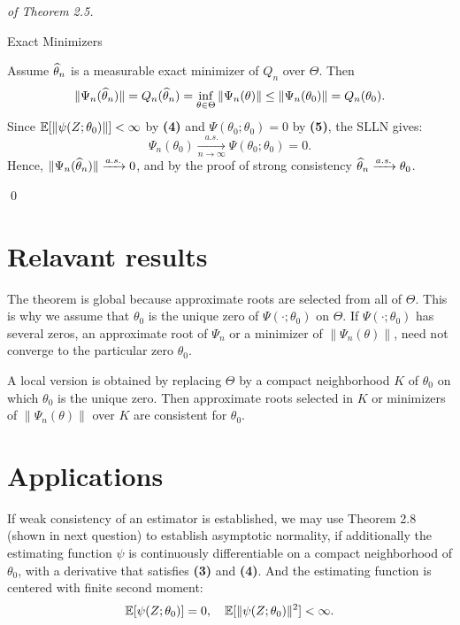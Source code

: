 \begin{proof}[of Theorem 2.5]
\begin{description}
\item[Exact Minimizers] 
\end{description}
Assume $\widehat{\theta}_n$ is a measurable exact minimizer of $Q_n$ over $\Theta$. Then
\[ 
  \| \Psi_n (\what{\theta}_n)\| = Q_n(\what{\theta}_n) = \inf_{\theta \in \Theta} \| \Psi_n(\theta)
  \| \le  \| \Psi_n(\theta_0) \| = Q_n (\theta_0)
.\]
Since $\mathbb{E}[ \| \psi(Z;\theta_0 ) \|] < \infty  $ by \textbf{(4)} and $\Psi(\theta_0;\theta_0)=0$ by
\textbf{(5)}, the SLLN gives:
\[ 
\Psi_n(\theta_0) \xrightarrow[n \to \infty ]{a.s.} \Psi(\theta_0;\theta_0) =0
.\]
Hence, $\| \Psi_n( \widehat{\theta}_n) \| \xrightarrow[]{a.s.} 0$, and by the proof of strong
consistency $\widehat{\theta}_n \xrightarrow[]{a.s.} \theta_0$.

\qed
\end{proof}


\section{Relavant results}

\begin{remark*}
  The theorem is global because approximate roots are selected from all of $\Theta$. This is why we
  assume that $\theta_0$ is the unique zero of $\Psi(\cdot ;\theta_0)$ on $\Theta$. If
  $\Psi(\cdot;\theta_0)$ has several zeros, an approximate root of $\Psi_n$ or a minimizer of $\|
  \Psi_n(\theta) \|$, need not converge to the particular zero $\theta_0$. 

  A local version is obtained by replacing $\Theta$ by a compact neighborhood $K$ of $\theta_0$
  on which $\theta_0$ is the unique zero. Then approximate roots selected in $K$ or minimizers of
  $\| \Psi_n(\theta) \|$ over $K$ are consistent for $\theta_0$.
\end{remark*}

\section{Applications}
If weak consistency of an estimator is established, we may use Theorem 2.8 (shown in next
question) to establish asymptotic normality, if additionally the estimating function $\psi$ is
continuously differentiable on a compact neighborhood of $\theta_0$, with a derivative that
satisfies \textbf{(3)} and \textbf{(4)}. And the estimating function is centered with finite second
moment:
\[ 
  \mathbb{E}[\psi(Z;\theta_0)]=0, \quad  \mathbb{E}[\| \psi(Z;\theta_0) \|^2 ] < \infty 
.\]





